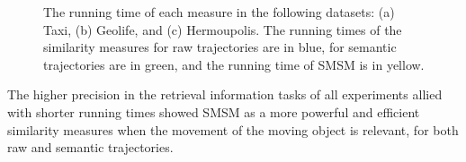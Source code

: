\begin{figure}[ht!]
\begin{subfigure}[c]{0.5\textwidth}
        \caption{}
        \label{fig:running_time_hermoupolis}
    \end{subfigure}\hfill %
    \caption{The running time of each measure in the following datasets: (a) Taxi, (b) Geolife, and (c) Hermoupolis. The running times of the similarity measures for raw trajectories are in blue, for semantic trajectories are in green, and the running time of SMSM is in yellow. }
    \label{fig:running_time_graphs}
\end{figure}

The higher precision in the retrieval information tasks of all experiments allied with shorter running times showed SMSM as a more powerful and efficient similarity measures when the movement of the moving object is relevant, for both raw and semantic trajectories.